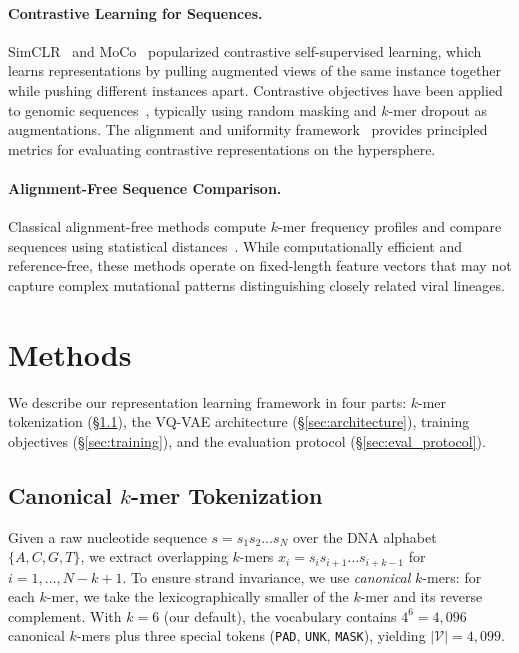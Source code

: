 \documentclass[pmlr]{jmlr}%
\begin{document}
\paragraph{Contrastive Learning for Sequences.}
SimCLR~\citep{chen2020simple} and MoCo~\citep{he2020momentum} popularized contrastive self-supervised learning, which learns representations by pulling augmented views of the same instance together while pushing different instances apart. Contrastive objectives have been applied to genomic sequences~\citep{yang2023contrastive}, typically using random masking and $k$-mer dropout as augmentations. The alignment and uniformity framework~\citep{wang2020understanding} provides principled metrics for evaluating contrastive representations on the hypersphere.

\paragraph{Alignment-Free Sequence Comparison.}
Classical alignment-free methods compute $k$-mer frequency profiles and compare sequences using statistical distances~\citep{sims2009alignment}. While computationally efficient and reference-free, these methods operate on fixed-length feature vectors that may not capture complex mutational patterns distinguishing closely related viral lineages.

\section{Methods}
\label{sec:methods}

We describe our representation learning framework in four parts: $k$-mer tokenization (\S\ref{sec:tokenization}), the VQ-VAE architecture (\S\ref{sec:architecture}), training objectives (\S\ref{sec:training}), and the evaluation protocol (\S\ref{sec:eval_protocol}).

\subsection{Canonical $k$-mer Tokenization}
\label{sec:tokenization}

Given a raw nucleotide sequence $s = s_1 s_2 \ldots s_N$ over the DNA alphabet $\{A, C, G, T\}$, we extract overlapping $k$-mers $x_i = s_i s_{i+1} \ldots s_{i+k-1}$ for $i = 1, \ldots, N - k + 1$. To ensure strand invariance, we use \emph{canonical} $k$-mers: for each $k$-mer, we take the lexicographically smaller of the $k$-mer and its reverse complement. With $k=6$ (our default), the vocabulary contains $4^6 = 4{,}096$ canonical $k$-mers plus three special tokens (\texttt{PAD}, \texttt{UNK}, \texttt{MASK}), yielding $|\mathcal{V}| = 4{,}099$.
\end{document}
